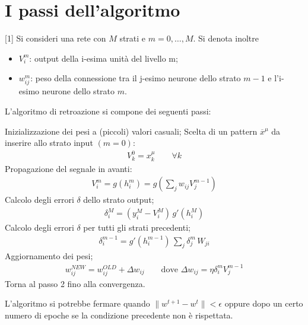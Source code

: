 
	\newpage

	\section{I passi dell'algoritmo} %
	\label{sec:l'algoritmo}

	\algrenewcommand{\alglinenumber}[1]{\scriptsize{}}%
	Si consideri una rete con $M$ strati e $m=0,\dots,M$. Si denota inoltre
	\begin{itemize}
		\item $V^m_i$: output della i-esima unità del livello m;
		\item $w^m_{ij}$: peso della connessione tra il j-esimo neurone dello strato $m-1$ e l'i-esimo neurone dello strato $m$. 
	\end{itemize}
	L'algoritmo di retroazione si compone dei seguenti passi:
	\begin{algorithmic}[1]%
		\State Inizializzazione dei pesi a (piccoli) valori casuali;
		\State Scelta di un pattern $\overline{x}^\mu$ da inserire allo strato input $(m=0)$:
		\begin{align*}
			V^0_k = x^\mu_k \qquad \forall k
		\end{align*}
		\State Propagazione del segnale in avanti:
		\begin{align*}
			V^m_i = g(h_i^m) = g\left(\sum_j w_{ij} V_j^{m-1}\right)
		\end{align*}
		\State Calcolo degli errori $\delta$ dello strato output;
		\begin{align*}
			\delta^M_i = (y^M_i - V^M_i) \, g'(h^M_i)
		\end{align*}
		\State Calcolo degli errori $\delta$ per tutti gli strati precedenti;
		\begin{align*}
			\delta^{m-1}_i = g'\left(h^{m-1}_i\right) \, \sum_j \delta^m_j \, W_{ji}
		\end{align*}
		\State Aggiornamento dei pesi;
		\begin{align*}
			w^{NEW}_{ij} = w^{OLD}_{ij} + \Delta w_{ij} \qquad \text{dove } \Delta w_{ij} = \eta \delta_i^m V_j^{m-1} 
		\end{align*}
		\State Torna al passo 2 fino alla convergenza.
	\end{algorithmic}
	L'algoritmo si potrebbe fermare quando $\| w^{t+1} - w^t \| < \epsilon$ oppure dopo un certo numero di epoche se la condizione precedente non è rispettata.

